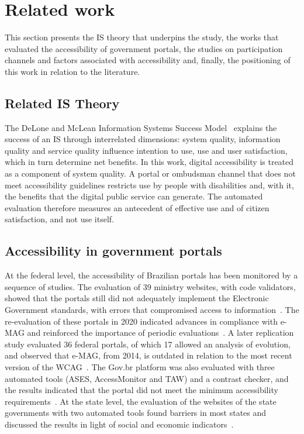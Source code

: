 \documentclass[12pt]{article}
\begin{document}
\section{Related work}
\label{sec:trabalhos}

This section presents the IS theory that underpins the study, the works that evaluated the accessibility of government portals, the studies on participation channels and factors associated with accessibility and, finally, the positioning of this work in relation to the literature.

\subsection{Related IS Theory}

The DeLone and McLean Information Systems Success Model~\cite{delone1992,delone2003} explains the success of an IS through interrelated dimensions: system quality, information quality and service quality influence intention to use, use and user satisfaction, which in turn determine net benefits. In this work, digital accessibility is treated as a component of system quality. A portal or ombudsman channel that does not meet accessibility guidelines restricts use by people with disabilities and, with it, the benefits that the digital public service can generate. The automated evaluation therefore measures an antecedent of effective use and of citizen satisfaction, and not use itself.

\subsection{Accessibility in government portals}

At the federal level, the accessibility of Brazilian portals has been monitored by a sequence of studies. The evaluation of 39 ministry websites, with code validators, showed that the portals still did not adequately implement the Electronic Government standards, with errors that compromised access to information~\cite{sbsi}. The re-evaluation of these portals in 2020 indicated advances in compliance with e-MAG and reinforced the importance of periodic evaluations~\cite{10.1145/3411564.3411656}. A later replication study evaluated 36 federal portals, of which 17 allowed an analysis of evolution, and observed that e-MAG, from 2014, is outdated in relation to the most recent version of the WCAG~\cite{10.1145/3658271.3658276}. The Gov.br platform was also evaluated with three automated tools (ASES, AccessMonitor and TAW) and a contrast checker, and the results indicated that the portal did not meet the minimum accessibility requirements~\cite{barros2024}. At the state level, the evaluation of the websites of the state governments with two automated tools found barriers in most states and discussed the results in light of social and economic indicators~\cite{carvalho2017}.
\end{document}
